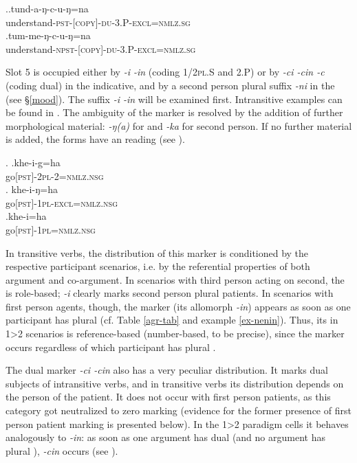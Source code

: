 \ex.\ag.tund-a-ŋ-c-u-ŋ=na\\
understand{\scshape -pst-[copy]-du-3.P-excl=nmlz.sg}\\
\bg.tum-me-ŋ-c-u-ŋ=na\\
understand{\scshape -npst-[copy]-du-3.P-excl=nmlz.sg}\\

Slot 5 is occupied either by \emph{-i \ti -in} (coding {\scshape 1/2pl.S} and {\scshape 2.P}) or by \emph{-ci \ti -cin \ti -c} (coding dual) in the indicative, and by a second person plural suffix \emph{-ni} in the (see §\ref{mood}). The suffix \emph{-i \ti -in} will be examined first. Intransitive examples can be found in \Next. The ambiguity of the marker is resolved by the addition of further morphological material: \emph{-ŋ(a)} for  and \emph{-ka} for second person. If no further material is added, the forms have an  reading (see \Next[c]).

	\ex. \ag.khe-i-g=ha\\
	go{\scshape [pst]-2pl-2=nmlz.nsg}\\
	\bg. khe-i-ŋ=ha\\
	go{\scshape [pst]-1pl-excl=nmlz.nsg}\\
	\bg.khe-i=ha\\
	go{\scshape [pst]-1pl=nmlz.nsg}\\

In transitive verbs, the distribution of this marker is conditioned by the respective participant  scenarios, i.e. by the referential properties of both argument and co-argument. In scenarios with third person acting on second, the  is role-based; \emph{-i} clearly marks second person plural patients. In scenarios with first person agents, though, the marker (its allomorph \emph{-in}) appears as soon as one parti\-cipant has plural (cf. Table \ref{agr-tab} and example \ref{ex-nenin}). Thus, its  in 1>2 scenarios is reference-based (number-based, to be precise), since the marker occurs regardless of which participant has plural . 

The dual marker \emph{-ci \ti -cin} also has a very peculiar distribution. It marks dual subjects of intransitive verbs, and in transitive verbs its distribution  depends on the person of the patient. It does not occur with first person patients, as this category got neutralized to zero marking (evidence for the former presence of first person patient marking is presented below). In the 1>2 paradigm cells it behaves analogously to \emph{-in}: as soon as one argument has dual (and no argument has plural ), \emph{-cin} occurs (see \Next). 

